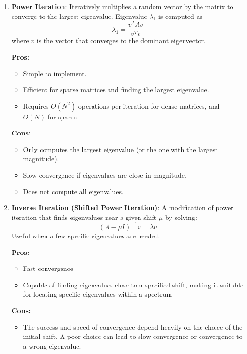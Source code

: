 \documentclass{article}
\theoremstyle{remark}
\begin{document}
\begin{enumerate}
    \item \textbf{Power Iteration}: Iteratively multiplies a random vector by the matrix to converge to the largest eigenvalue. Eigenvalue $\lambda_1$ is computed as $$\lambda_1=\frac{v^T A v}{v^T v}$$ where $v$ is the vector that converges to the dominant eigenvector.

        \textbf{Pros:}
    \begin{itemize}
        \item Simple to implement.
        \item Efficient for sparse matrices and finding the largest eigenvalue.
        \item Requires $O(N^2)$ operations per iteration for dense matrices, and $O(N)$ for sparse.
        
    \end{itemize}

    \textbf{Cons:}
    \begin{itemize}
        \item Only computes the largest eigenvalue (or the one with the largest magnitude).

        \item Slow convergence if eigenvalues are close in magnitude.

        \item Does not compute all eigenvalues.
    \end{itemize}

    

    \item \textbf{Inverse Iteration (Shifted Power Iteration)}: A modification of power iteration that finds eigenvalues near a given shift $\mu$  by solving: $$(A-\mu I)^{-1} v =\lambda v$$ Useful when a few specific eigenvalues are needed.

    \textbf{Pros:}
    \begin{itemize}
        \item Fast convergence

        \item Capable of finding eigenvalues close to a specified shift, making it suitable for locating specific eigenvalues within a spectrum
    \end{itemize}

    \textbf{Cons:} 
    
    \begin{itemize}
        \item The success and speed of convergence depend heavily on the choice of the initial shift. A poor choice can lead to slow convergence or convergence to a wrong eigenvalue.


\end{itemize}
\end{enumerate}
\end{document}
